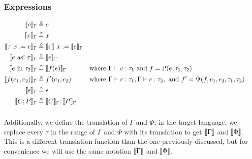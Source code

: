 \subsubsection{Expressions}
\begin{align*}
\source{c}_\Gamma &\triangleq c \\
\source{x}_\Gamma &\triangleq x \\
\source{\tau\ x := e}_\Gamma &\triangleq \source{\tau}\ x := \source{e}_\Gamma \\
\source{e\ \mathrm{as!}\ \tau}_\Gamma&\triangleq \source{e}_\Gamma \\
\source{e\ \mathrm{in}\ \tau_2}_\Gamma&\triangleq \source{f(e)}_\Gamma&\text{where }&\Gamma|-e:\tau_1\text{ and }f=\mathrm{P}(e,\tau_1,\tau_2)\\
\source{f(e_1, e_2)}_\Gamma&\triangleq f'(e_1, e_2)&\text{where }&\Gamma|-e:\tau_1,\Gamma|-e:\tau_2,\text{ and }f'=\Psi(f,e_1,e_2,\tau_1,\tau_2)\\
\source{\epsilon}_\Gamma&\triangleq \epsilon\\
\source{C;P}_\Gamma&\triangleq\source{C}_\Gamma;\source{P}_\Gamma\\
\end{align*}

\subsubsection{}
Additionally, we define the translation of $\Gamma$ and $\Phi$; in the target language, we replace every $\tau$ in the range of $\Gamma$ and $\Phi$ with its translation to get $\source{\Gamma}$ and $\source{\Phi}$. This is a different translation function than the one previously discussed, but for convenience we will use the same notation $\source{\Gamma}$ and $\source{\Phi}$.\\
\begin{lemma}
\label{lem:contexttr}
\begin{mathpar}
\end{mathpar}
\begin{mathpar}
\end{mathpar}
\end{lemma}

